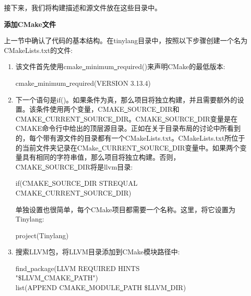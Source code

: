 接下来，我们将构建描述和源文件放在这些目录中。\par

\hspace*{\fill} \par %
\textbf{添加CMake文件}

上一节中确认了代码的基本结构。在tinylang目录中，按照以下步骤创建一个名为CMakeLists.txt的文件:\par

\begin{enumerate}
\item 该文件首先使用cmake\underline{~}minimum\underline{~}required()来声明CMake的最低版本:
\begin{tcolorbox}[colback=white,colframe=black]
cmake\underline{~}minimum\underline{~}required(VERSION 3.13.4)
\end{tcolorbox}

\item 下一个语句是if()。如果条件为真，那么项目将独立构建，并且需要额外的设置。该条件使用两个变量，CMAKE\underline{~}SOURCE\underline{~}DIR和CMAKE\underline{~}CURRENT\underline{~}SOURCE\underline{~}DIR。CMAKE\underline{~}SOURCE\underline{~}DIR变量是在CMAKE命令行中给出的顶层源目录。正如在关于目录布局的讨论中所看到的，每个带有源文件的目录都有一个CMakeLists.txt。CMakeLists.txt所位于的当前文件夹记录在CMake\underline{~}CURRENT\underline{~}SOURCE\underline{~}DIR变量中。如果两个变量具有相同的字符串值，那么项目将独立构建。否则，CMAKE\underline{~}SOURCE\underline{~}DIR将是llvm目录:
\begin{tcolorbox}[colback=white,colframe=black]
if(CMAKE\underline{~}SOURCE\underline{~}DIR STREQUAL CMAKE\underline{~}CURRENT\underline{~}SOURCE\underline{~}DIR)
\end{tcolorbox}

单独设置也很简单，每个CMake项目都需要一个名称。这里，将它设置为Tinylang:
\begin{tcolorbox}[colback=white,colframe=black]
\hspace*{0.5cm}project(Tinylang)
\end{tcolorbox}

\item 搜索LLVM包，将LLVM目录添加到CMake模块路径中:
\begin{tcolorbox}[colback=white,colframe=black]
\hspace*{0.5cm}find\underline{~}package(LLVM REQUIRED HINTS \\
\hspace*{1cm}"\${LLVM\underline{~}CMAKE\underline{~}PATH}") \\
\hspace*{0.5cm}list(APPEND CMAKE\underline{~}MODULE\underline{~}PATH \${LLVM\underline{~}DIR})
\end{tcolorbox}


\end{enumerate}
